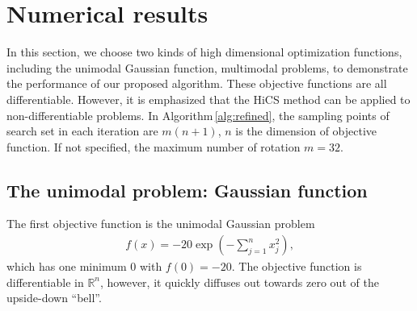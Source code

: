 \documentclass[final,1p,times]{elsarticle}
\def\bbR{\mathbb{R}}
\begin{document}


\section{Numerical results}
\label{sec:experiment}

In this section, we choose two kinds of high dimensional optimization functions,
including the unimodal Gaussian function, multimodal problems,
to demonstrate the performance of our proposed algorithm. 
These objective functions are all differentiable. However, it is
emphasized that the HiCS method can be applied to
non-differentiable problems. 
In Algorithm\,\ref{alg:refined}, the sampling points of 
search set in each iteration are $m(n+1)$, $n$ is the dimension
of objective function. If not specified, the maximum number of
rotation $m=32$.

\subsection{The unimodal problem: Gaussian function}
\label{subsec:gauss}

The first objective function is the unimodal Gaussian problem
\begin{align}
	f(x) = -20\exp\left(-\sum_{j=1}^n x_j^2 \right),
	\label{eqn:exp1}
\end{align}
which has one minimum $0$ with $f(0)=-20$.
The objective function is differentiable in $\bbR^n$, however,
it quickly diffuses out towards zero out of the upside-down ``bell''. 
\end{document}
